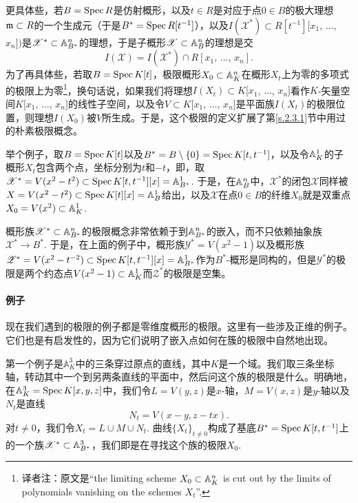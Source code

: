 更具体些，若$B=\operatorname{Spec} R$是仿射概形，以及$t\in R$是对应于点$0\in B$的极大理想$\mathfrak{m}\subset R$的一个生成元（于是$B^*=\operatorname{Spec} R[t^{-1}]$），以及$I(\mathscr{X}^*)\subset R[t^{-1}][x_1$, $\dots$, $x_n])$是$\mathscr{X}^*\subset \mathbb{A}_{B^*}^n$的理想，于是子概形$\mathscr{X}\subset \mathbb{A}_{B}^n$的理想是交
\[
	I(\mathscr{X})=I(\mathscr{X}^*)\cap R[x_1,\,\dots,\,x_n].
\]
为了再具体些，若取$B=\operatorname{Spec} K[t]$，极限概形$X_0\subset \mathbb{A}_K^n$在概形$X_t$上为零的多项式的极限上为零\footnote{译者注：原文是``the limiting scheme $X_0\subset \mathbb{A}_K^n$ is cut out by the limits of polynomials vanishing on the schemes $X_t$''.}\nottran ，换句话说，如果我们将理想$I(X_t)\subset K[x_1$, $\dots$, $x_n]$看作$K$\hyp 矢量空间$K[x_1$, $\dots$, $x_n]$的线性子空间，以及令$V\subset K[x_1$, $\dots$, $x_n]$是平面族$I(X_t)$的极限位置\nottran ，则理想$I(X_0)$被$V$所生成。于是，这个极限的定义扩展了第\ref{s.2.3.1}节中用过的朴素极限概念。

举个例子，取$B=\operatorname{Spec} K[t]$以及$B^*=B\setminus \{0\}=\operatorname{Spec} K[t,t^{-1}]$，以及令$\mathbb{A}_K^1$的子概形$X_t$包含两个点，坐标分别为$t$和$-t$，即，取$\mathscr{X}^*=V(x^2-t^2)\subset \operatorname{Spec} K[t,t^{-1}][x]=\mathbb{A}_{B^*}^1$. 于是，在$\mathbb{A}_B^n$中，$\mathscr{X}^*$的闭包$\mathscr{X}$同样被$X=V(x^2-t^2)\subset \operatorname{Spec} K[t][x]=\mathbb{A}_B^1$给出，以及$\mathscr{X}$在点$0\in B$的纤维$X_0$就是双重点$X_0=V(x^2)\subset\mathbb{A}_K^1$.

概形族$\mathscr{X}^*\subset \mathbb{A}_{B^*}^n$的极限概念非常依赖于到$\mathbb{A}_{B^*}^n$的嵌入，而不只依赖抽象族$\mathscr{X}^*\to B^*$. 于是，在上面的例子中，概形族$\mathscr{Y}^*=V(x^2-1)$以及概形族$\mathscr{Z}^*=V(x^2-t^{-2})\subset \operatorname{Spec} K[t,t^{-1}][x]=\mathbb{A}_{B^*}^1$作为$B^*$\hyp 概形是同构的，但是$\mathscr{Y}^*$的极限是两个约态点$V(x^2-1)\subset \mathbb{A}^1_K$而$\mathscr{Z}^*$的极限是空集。

\paragraph*{例子}
现在我们遇到的极限的例子都是零维度概形的极限。这里有一些涉及正维的例子。 它们也是有启发性的，因为它们说明了嵌入点如何在簇的极限中自然地出现。

第一个例子是$\mathbb{A}_K^3$中的三条穿过原点的直线，其中$K$是一个域。我们取三条坐标轴，转动其中一个到另两条直线的平面中，然后问这个族的极限是什么。明确地，在$\mathbb{A}_K^3=\operatorname{Spec} K[x,y,z]$中，我们令$L=V(y,z)$是$x$-轴，$M=V(x,z)$是$y$-轴以及$N_t$是直线
\[
	N_t=V(x-y,z-tx).
\]
对$t\neq 0$，我们令$X_t=L\cup M\cup N_t$. 曲线$\{X_t\}_{t\neq 0}$构成了基底$B^*=\operatorname{Spec} K[t,t^{-1}]$上的一个族$\mathscr{X}^*\subset \mathbb{A}_{B^*}^3$，我们即是在寻找这个族的极限$X_0$.

